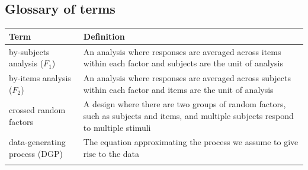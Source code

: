 \documentclass[man,floatsintext]{apa6}
\begin{document}
\begin{appendix}
\hypertarget{glossary-of-terms}{%
\section{Glossary of terms}\label{glossary-of-terms}}

\begin{longtable}[]{@{}ll@{}}
\toprule
\begin{minipage}[b]{0.27\columnwidth}\raggedright
Term\strut
\end{minipage} & \begin{minipage}[b]{0.67\columnwidth}\raggedright
Definition\strut
\end{minipage}\tabularnewline
\midrule
\endhead
\begin{minipage}[t]{0.27\columnwidth}\raggedright
by-subjects analysis (\(F_1\))\strut
\end{minipage} & \begin{minipage}[t]{0.67\columnwidth}\raggedright
An analysis where responses are averaged across items within each factor
and subjects are the unit of analysis\strut
\end{minipage}\tabularnewline
\begin{minipage}[t]{0.27\columnwidth}\raggedright
by-items analysis (\(F_2\))\strut
\end{minipage} & \begin{minipage}[t]{0.67\columnwidth}\raggedright
An analysis where responses are averaged across subjects within each
factor and items are the unit of analysis\strut
\end{minipage}\tabularnewline
\begin{minipage}[t]{0.27\columnwidth}\raggedright
crossed random factors\strut
\end{minipage} & \begin{minipage}[t]{0.67\columnwidth}\raggedright
A design where there are two groups of random factors, such as subjects
and items, and multiple subjects respond to multiple stimuli\strut
\end{minipage}\tabularnewline
\begin{minipage}[t]{0.27\columnwidth}\raggedright
data-generating process (DGP)\strut
\end{minipage} & \begin{minipage}[t]{0.67\columnwidth}\raggedright
The equation approximating the process we assume to give rise to the
data\strut
\end{minipage}\tabularnewline
\begin{minipage}[t]{0.27\columnwidth}\raggedright

\end{minipage}
\end{longtable}
\end{appendix}
\end{document}
